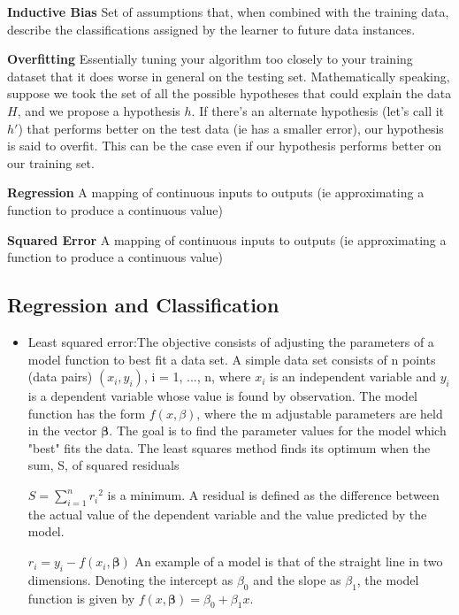 \documentclass[titlepage,11pt]{article}
\begin{document}
\par\noindent\hangindent=1cm \textbf{Inductive Bias} Set of assumptions that, when combined with the training data, describe the classifications assigned by the learner to future data instances.\\

\par\noindent\hangindent=1cm \textbf{Overfitting} Essentially tuning your algorithm too closely to your training dataset that it does worse in general on the testing set. Mathematically speaking, suppose we took the set of all the possible hypotheses that could explain the data $H$, and we propose a hypothesis $h$. If there's an alternate hypothesis (let's call it $h'$) that performs better on the test data (ie has a smaller error), our hypothesis is said to overfit. This can be the case even if our hypothesis performs better on our training set.\\

\par\noindent\hangindent=1cm \textbf{Regression} A mapping of continuous inputs to outputs (ie approximating a function to produce a continuous value)\\

\par\noindent\hangindent=1cm \textbf{Squared Error} A mapping of continuous inputs to outputs (ie approximating a function to produce a continuous value)\\

\subsection{Regression and Classification}
\begin{itemize}
\item Least squared error:The objective consists of adjusting the parameters of a model function to best fit a data set. A simple data set consists of n points (data pairs) $(x_i,y_i)$, i = 1, ..., n, where $x_i$ is an independent variable and $y_i$ is a dependent variable whose value is found by observation. The model function has the form $f(x,\beta)$, where the m adjustable parameters are held in the vector $\boldsymbol \beta$. The goal is to find the parameter values for the model which "best" fits the data. The least squares method finds its optimum when the sum, S, of squared residuals

$S=\sum_{i=1}^{n}{r_i}^2$
is a minimum. A residual is defined as the difference between the actual value of the dependent variable and the value predicted by the model.

$r_i=y_i-f(x_i,\boldsymbol \beta)$
An example of a model is that of the straight line in two dimensions. Denoting the intercept as $\beta_0$ and the slope as $\beta_1$, the model function is given by $f(x,\boldsymbol \beta)=\beta_0+\beta_1 x$.
\end{itemize}
\end{document}
